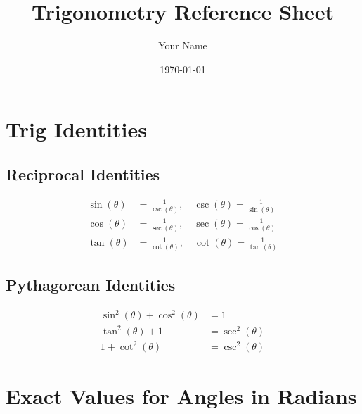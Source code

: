\documentclass{article}
\begin{document}
\title{Trigonometry Reference Sheet}
\author{Your Name}
\date{\today}
\maketitle

\section{Trig Identities}

\subsection{Reciprocal Identities}
\[
\begin{aligned}
\sin(\theta) &= \frac{1}{\csc(\theta)}, \quad \csc(\theta) = \frac{1}{\sin(\theta)} \\
\cos(\theta) &= \frac{1}{\sec(\theta)}, \quad \sec(\theta) = \frac{1}{\cos(\theta)} \\
\tan(\theta) &= \frac{1}{\cot(\theta)}, \quad \cot(\theta) = \frac{1}{\tan(\theta)}
\end{aligned}
\]

\subsection{Pythagorean Identities}
\[
\begin{aligned}
\sin^2(\theta) + \cos^2(\theta) &= 1 \\
\tan^2(\theta) + 1 &= \sec^2(\theta) \\
1 + \cot^2(\theta) &= \csc^2(\theta)
\end{aligned}
\]

\section{Exact Values for Angles in Radians}
\end{document}
